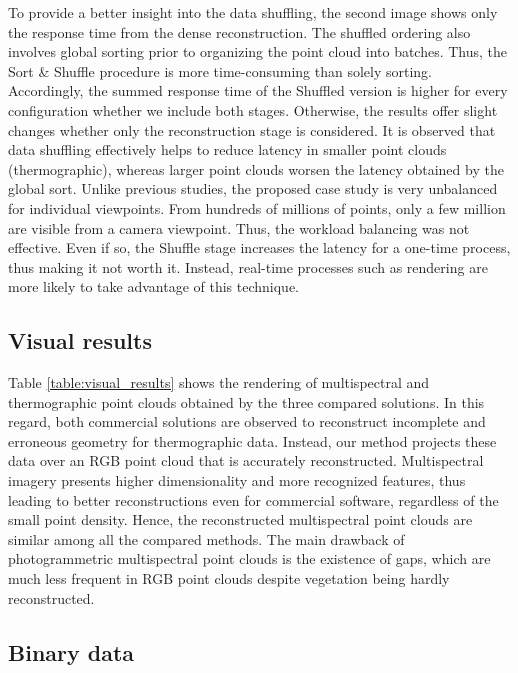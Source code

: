 To provide a better insight into the data shuffling, the second image shows only the response time from the dense reconstruction. The shuffled ordering also involves global sorting prior to organizing the point cloud into batches. Thus, the Sort \& Shuffle procedure is more time-consuming than solely sorting. Accordingly, the summed response time of the Shuffled version is higher for every configuration whether we include both stages. Otherwise, the results offer slight changes whether only the reconstruction stage is considered. It is observed that data shuffling effectively helps to reduce latency in smaller point clouds (thermographic), whereas larger point clouds worsen the latency obtained by the global sort. Unlike previous studies, the proposed case study is very unbalanced for individual viewpoints. From hundreds of millions of points, only a few million are visible from a camera viewpoint. Thus, the workload balancing was not effective. Even if so, the Shuffle stage increases the latency for a one-time process, thus making it not worth it. Instead, real-time processes such as rendering are more likely to take advantage of this technique.

\subsection{Visual results}

Table \ref{table:visual_results} shows the rendering of multispectral and thermographic point clouds obtained by the three compared solutions. In this regard, both commercial solutions are observed to reconstruct incomplete and erroneous geometry for thermographic data. Instead, our method projects these data over an RGB point cloud that is accurately reconstructed. Multispectral imagery presents higher dimensionality and more recognized features, thus leading to better reconstructions even for commercial software, regardless of the small point density. Hence, the reconstructed multispectral point clouds are similar among all the compared methods. The main drawback of photogrammetric multispectral point clouds is the existence of gaps, which are much less frequent in RGB point clouds despite vegetation being hardly reconstructed. 

\subsection{Binary data}

